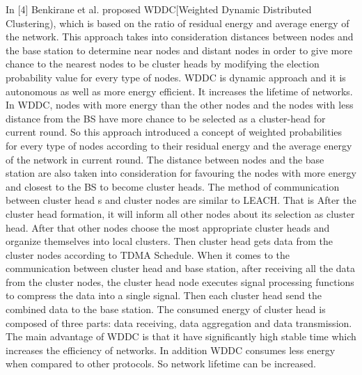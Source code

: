 \documentclass[MTech]{iitmdiss}
\begin{document}
In [4] Benkirane et al. proposed WDDC[Weighted Dynamic Distributed Clustering), which is based on the ratio of residual  energy and average energy of the network. This approach  takes into consideration distances between nodes  and the base station to determine near nodes and distant nodes in order to give more chance to  the nearest nodes to be cluster heads by modifying  the election probability value for every type  of nodes. WDDC is dynamic approach and it is autonomous as well as more energy efficient. It increases the lifetime of networks. In WDDC, nodes with more energy than the other nodes and the nodes with less distance  from the BS have more chance to be selected as a cluster-head for current round. So this approach introduced a concept of weighted probabilities for every type of nodes according to their residual energy and the average energy of the network in current round. The distance between nodes and the base  station are also taken into consideration  for favouring the  nodes with more  energy and closest to the BS to become cluster heads. The method of communication between cluster head s and cluster nodes are similar to LEACH. That is After the cluster head formation, it will inform all other nodes about its selection as cluster head. After that other nodes choose the most appropriate cluster heads and organize themselves into local clusters. Then cluster head gets data from the cluster nodes according to TDMA Schedule. When it comes to the communication between cluster head and base station, after  receiving all the data from the cluster nodes, the cluster head node executes signal 
processing functions to compress the data into a single signal. Then  each cluster head  send the combined data to the base station. The consumed energy of cluster head is composed of three parts: data receiving, data  aggregation and data transmission. The main advantage of WDDC is that it have significantly high stable time which increases the  efficiency of networks. In addition WDDC consumes less energy when compared to other protocols. So network lifetime can be increased.
\end{document}
